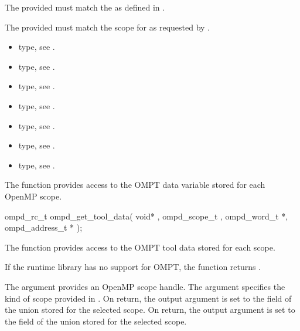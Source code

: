 The provided  must match the  as defined in 
. 

The provided  must match the scope for  as requested by 
. 


\crossreferences
\begin{itemize}
	\item {} type, see 
	.
	\item {} type, see .
	\item {} type, see 
	.
	\item {} type, see .
	\item {} type, see .
	\item {} type, see .
	\item {} type, see .
\end{itemize}

\label{subsubsubsec:ompd_get_tool_data}
\summary
The  function provides access to the OMPT data variable 
stored for each OpenMP scope.

\format

\begin{cspecific}
\begin{ompSyntax}
ompd_rc_t ompd_get_tool_data(
  void* , 
  ompd_scope_t ,
  ompd_word_t *,
  ompd_address_t *
);
\end{ompSyntax}
\end{cspecific}

\descr
The function  provides access to the OMPT tool data
stored for each scope.

If the runtime library has no support for OMPT, the function returns 
.


\argdesc
The argument  provides an OpenMP scope handle.
The argument  specifies the kind of scope provided in .
On return, the output argument  is set to the  field of the 
 union stored for the selected scope.
On return, the output argument  is set to the   field of the 
 union stored for the selected scope.


